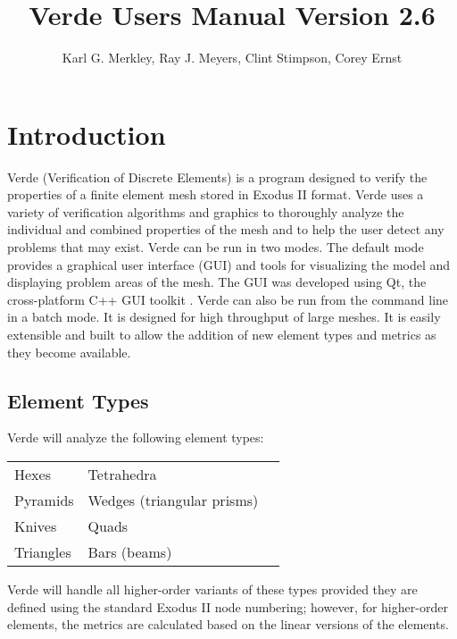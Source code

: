 \documentclass[10pt]{report}
\title{Verde Users Manual Version 2.6}
\author{Karl G. Merkley, Ray J. Meyers, Clint Stimpson, Corey Ernst}
\begin{document}
\maketitle
\W\begin{iftex}
  \setcounter{page}{1}   
  \tableofcontents
  \listoffigures
  \listoftables
  \newpage
\W\end{iftex}

\chapter{Introduction}
\label{sec:introduction}

Verde (Verification of Discrete Elements) 
is a program designed to verify the properties of a finite element 
mesh stored in Exodus II format\cite{schoof}\cite{netCDF}.
Verde uses a variety of verification 
algorithms and graphics to thoroughly analyze the individual and combined properties 
of the mesh and to help the user detect any problems that may exist.  
Verde can be run in two modes.  The default mode provides a graphical 
user interface (GUI) and tools for visualizing the model and displaying 
problem areas of the mesh.   
The GUI was developed using Qt, the cross-platform C++ GUI 
toolkit \cite{trolltech}.
Verde can also be run from the command line in a batch 
mode.  It is designed for high throughput of large meshes.  It is  
easily extensible and built to allow the addition of new element types and 
metrics as they become available.


\section{Element Types}
\label{sec:element_types}

Verde will analyze the following element types:

\begin{center}
\begin{tabular}{lll}
Hexes     & Tetrahedra                 \\
Pyramids  & Wedges (triangular prisms) \\
Knives    & Quads                      \\
Triangles & Bars (beams)               \\
\end{tabular}
\end{center}


Verde will handle all higher-order variants of these types provided they 
are defined using the standard Exodus II node numbering; however, for 
higher-order elements, the metrics are calculated based on the linear 
versions of the elements.
\end{document}
